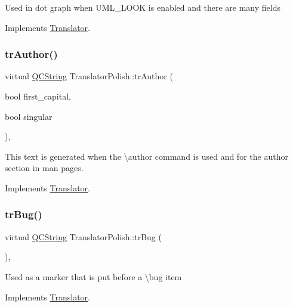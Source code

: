 Used in dot graph when U\+M\+L\+\_\+\+L\+O\+OK is enabled and there are many fields 

Implements \mbox{\hyperlink{class_translator}{Translator}}.

\mbox{\label{class_translator_polish_ad18ec9733cbb0c05a354fe60937f4fe4}} 
\subsubsection{\texorpdfstring{trAuthor()}{trAuthor()}}
{\footnotesize\ttfamily virtual \mbox{\hyperlink{class_q_c_string}{Q\+C\+String}} Translator\+Polish\+::tr\+Author (\begin{DoxyParamCaption}\item[{bool}]{first\+\_\+capital,  }\item[{bool}]{singular }\end{DoxyParamCaption})\hspace{0.3cm}{\ttfamily [inline]}, {\ttfamily [virtual]}}

This text is generated when the \textbackslash{}author command is used and for the author section in man pages. 

Implements \mbox{\hyperlink{class_translator}{Translator}}.

\mbox{\label{class_translator_polish_aa91f8e15b22436ae26172dbe68a6adf8}} 
\subsubsection{\texorpdfstring{trBug()}{trBug()}}
{\footnotesize\ttfamily virtual \mbox{\hyperlink{class_q_c_string}{Q\+C\+String}} Translator\+Polish\+::tr\+Bug (\begin{DoxyParamCaption}{ }\end{DoxyParamCaption})\hspace{0.3cm}{\ttfamily [inline]}, {\ttfamily [virtual]}}

Used as a marker that is put before a \textbackslash{}bug item 

Implements \mbox{\hyperlink{class_translator}{Translator}}.

\mbox{\label{class_translator_polish_a20de56dd770718181b091c4158bf0657}} 
